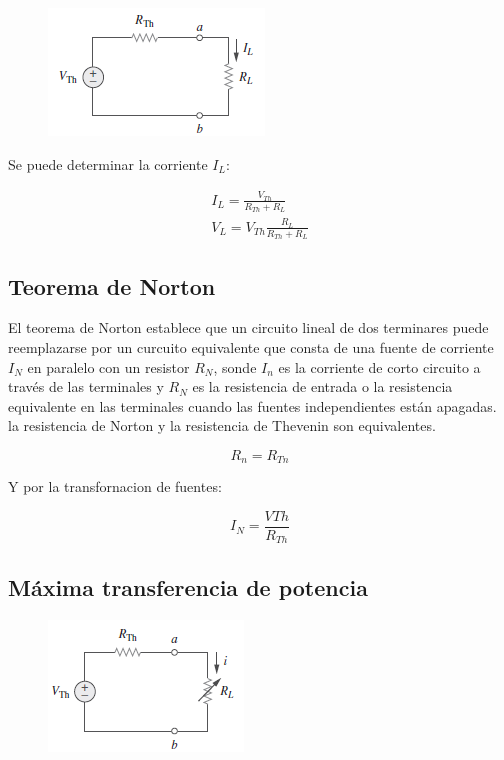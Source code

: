 \begin{figure}[H]
    \centering
    \includegraphics{Elect_circ/circ_f2.png}
\end{figure}

Se puede determinar la corriente $I_L$:

\begin{eqnarray*}
I_L = \frac{V_{Th}}{R_{Th}+R_L} \\
V_L = V_{Th} \frac{R_{L}}{R_{Th}+R_L}
\end{eqnarray*}

\subsection{Teorema de Norton}

El teorema de Norton establece que un circuito lineal de dos terminares puede reemplazarse por un curcuito equivalente que consta de una fuente de corriente $I_N$ en paralelo con un resistor $R_N$, sonde $I_n$ es la corriente de corto circuito a través de las terminales y $R_N$ es la resistencia de entrada o la resistencia equivalente en las terminales cuando las fuentes independientes están apagadas. \\

la resistencia de Norton y la resistencia de Thevenin son equivalentes. 

\begin{equation*}
R_n = R_{Tn}
\end{equation*}

Y por la transfornacion de fuentes:

\begin{equation*}
I_N = \frac{V{Th}}{R_{Th}}
\end{equation*}

\subsection{Máxima transferencia de potencia} \label{max_transf_pot}

\begin{figure}[H]
    \centering
    \includegraphics{Elect_circ/circ_f3.png}
\end{figure}

